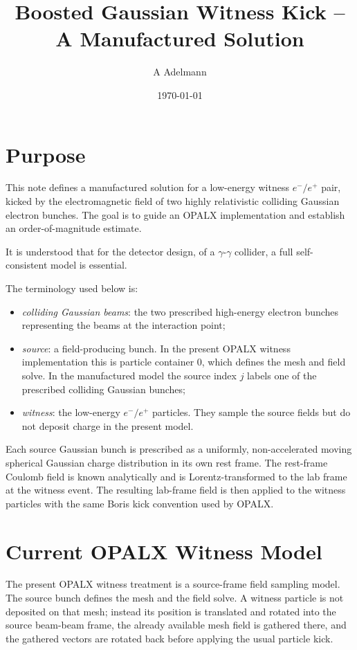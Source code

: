 \documentclass[11pt]{article}
\title{Boosted Gaussian Witness Kick  -- A Manufactured Solution}
\author{A Adelmann}
\date{\today}
\numberwithin{equation}{section}
\begin{document}
\maketitle

\section{Purpose}

This note defines a manufactured solution for a low-energy witness
\(e^-/e^+\) pair, kicked by the electromagnetic field of two highly
relativistic colliding Gaussian electron bunches.  The goal is to guide an
OPALX implementation and establish an order-of-magnitude estimate.

It is understood that for the detector design, of a $\gamma\text{-}\gamma$ collider, a full self-consistent model is essential. 

The terminology used below is:
\begin{itemize}
  \item \emph{colliding Gaussian beams}: the two prescribed high-energy
        electron bunches representing the beams at the interaction point;
  \item \emph{source}: a field-producing bunch.  In the present OPALX witness
        implementation this is particle container 0, which defines the mesh and
        field solve.  In the manufactured model the source index \(j\) labels
        one of the prescribed colliding Gaussian bunches;
  \item \emph{witness}: the low-energy \(e^-/e^+\) particles.  They sample the
        source fields but do not deposit charge in the present model.
\end{itemize}

Each source Gaussian bunch is prescribed as a uniformly, non-accelerated moving
spherical Gaussian charge distribution in its own rest frame.  The rest-frame
Coulomb field is known analytically and is Lorentz-transformed to the lab frame
at the witness event.  The resulting lab-frame field is then applied to the
witness particles with the same Boris kick convention used by OPALX.

\section{Current OPALX Witness Model}

The present OPALX witness treatment is a source-frame field sampling model.
The source bunch defines the mesh and the field solve.  A witness particle is
not deposited on that mesh; instead its position is translated and rotated into
the source beam-beam frame, the already available mesh field is gathered there,
and the gathered vectors are rotated back before applying the usual particle
kick.
\end{document}
